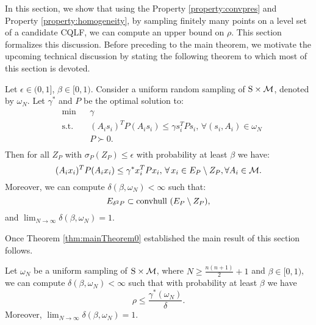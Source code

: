 In this section, we show that using the Property \ref{property:convpres} and Property \ref{property:homogeneity}, by sampling finitely many points on a level set of a candidate CQLF, we can compute an upper bound on $\rho$. This section formalizes this discussion. Before preceding to the main theorem, we motivate the upcoming technical discussion by stating the following theorem to which most of this section is devoted.

\begin{theorem} \label{thm:mainTheorem0} Let $\epsilon \in (0,1]$, $\beta \in [0,1)$. Consider a uniform random sampling of $\text{S} \times \mathcal{M}$, denoted by $\omega_N$. Let $\gamma^*$ and $P$ be the optimal solution to:
\begin{equation}\label{eqn:campiOpt01}
\begin{aligned}
& \text{min} & & \gamma \\
& \text{s.t.} 
&  & (A_is_i)^TP(A_is_i) \leq \gamma s_i^TPs_i,\,\forall (s_i,A_i) \in \omega_N \\
& && P \succ 0. \\
\end{aligned}
\end{equation}
Then for all $Z_P$ with $\sigma_P(Z_P)\leq \epsilon$ with probability at least $\beta$ we have:
\begin{equation} \label{eqn:exceptEps}(A_ix_i)^TP(A_ix_i)\leq \gamma^*x_i^TPx_i,\,\forall\, x_i \in E_P \setminus Z_P, \forall A_i \in \mathcal{M}.\end{equation}
Moreover, we can compute $\delta(\beta, \omega_N) < \infty$  such that:
\begin{equation}\label{eqn:contraction}E_{\delta^2P} \subset  \mbox{convhull } (E_{P} \setminus Z_{P}),
\end{equation}
and $\lim_{N \to \infty} \delta(\beta, \omega_N) = 1.$
\end{theorem}

Once Theorem \ref{thm:mainTheorem0} established the main result of this section follows.

\begin{theorem} \label{thm:mainTheorem} Let $\omega_N$ be a uniform sampling of $\text{S} \times \mathcal{M}$, where $N \geq \frac{n(n+1)}{2}+1$ and $\beta \in [0,1)$, we can compute $\delta(\beta, \omega_N) < \infty$ such that with probability at least $\beta$ we have $$\rho \leq \frac{\gamma^*(\omega_N)}{\delta}.$$ Moreover, $\lim_{N \to \infty} \delta(\beta, \omega_N) = 1$.
\end{theorem}

